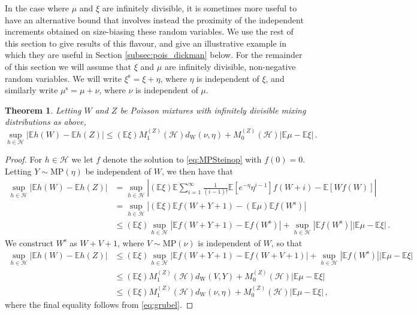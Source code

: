 \documentclass[12pt]{article}
\newtheorem{theorem}{Theorem}
\begin{document}
In the case where $\mu$ and $\xi$ are infinitely divisible, it is sometimes more useful to have an alternative bound that involves instead the proximity of the independent increments obtained on size-biasing these random variables. We use the rest of this section to give results of this flavour, and give an illustrative example in which they are useful in Section \ref{subsec:pois_dickman} below.    
For the remainder of this section we will assume that $\xi$ and $\mu$ are infinitely divisible, non-negative random variables. We will write $\xi^\text{s}=\xi+\eta$, where $\eta$ is independent of $\xi$, and similarly write $\mu^\text{s}=\mu+\nu$, where $\nu$ is independent of $\mu$. 
\begin{theorem}\label{thm:MP}
Letting $W$ and $Z$ be Poisson mixtures with infinitely divisible mixing distributions as above,
\[
\sup_{h\in\mathcal{H}}|\mathbb{E}h(W)-\mathbb{E}h(Z)|\leq(\mathbb{E}\xi)M_1^{(Z)}(\mathcal{H})d_\text{W}(\nu,\eta)+M_0^{(Z)}(\mathcal{H})|\mathbb{E}\mu-\mathbb{E}\xi|\,.
\]
\end{theorem}
\begin{proof}
For $h\in\mathcal{H}$ we let $f$ denote the solution to \eqref{eq:MPSteinop} with $f(0)=0$. Letting $Y\sim\text{MP}(\eta)$ be independent of $W$, we then have that
\begin{align*}
\sup_{h\in\mathcal{H}}|\mathbb{E}h(W)-\mathbb{E}h(Z)| &=\sup_{h\in\mathcal{H}}\left|(\mathbb{E}\xi)\mathbb{E}\sum_{i=1}^\infty\frac{1}{(i-1)!}\mathbb{E}[e^{-\eta}\eta^{i-1}]f(W+i)-\mathbb{E}[Wf(W)]\right|\\
&=\sup_{h\in\mathcal{H}}\left|(\mathbb{E}\xi)\mathbb{E}f(W+Y+1)-(\mathbb{E}\mu)\mathbb{E}f(W^\text{s})\right|\\
&\leq(\mathbb{E}\xi)\sup_{h\in\mathcal{H}}\left|\mathbb{E}f(W+Y+1)-\mathbb{E}f(W^\text{s})\right|
+\sup_{h\in\mathcal{H}}\left|\mathbb{E}f(W^\text{s})\right|\left|\mathbb{E}\mu-\mathbb{E}\xi\right|\,.
\end{align*}
We construct $W^\text{s}$ as $W+V+1$, where $V\sim\text{MP}(\nu)$ is independent of $W$, so that
\begin{align*}
\sup_{h\in\mathcal{H}}|\mathbb{E}h(W)-\mathbb{E}h(Z)|&\leq(\mathbb{E}\xi)\sup_{h\in\mathcal{H}}\left|\mathbb{E}f(W+Y+1)-\mathbb{E}f(W+V+1)\right|+\sup_{h\in\mathcal{H}}\left|\mathbb{E}f(W^\text{s})\right|\left|\mathbb{E}\mu-\mathbb{E}\xi\right|\\
&\leq(\mathbb{E}\xi)M_1^{(Z)}(\mathcal{H})d_\text{W}(V,Y)+M_0^{(Z)}(\mathcal{H})|\mathbb{E}\mu-\mathbb{E}\xi|\\
&\leq(\mathbb{E}\xi)M_1^{(Z)}(\mathcal{H})d_\text{W}(\nu,\eta)+M_0^{(Z)}(\mathcal{H})|\mathbb{E}\mu-\mathbb{E}\xi|\,,
\end{align*}
where the final equality follows from \eqref{eq:grubel}.
\end{proof}
\end{document}
